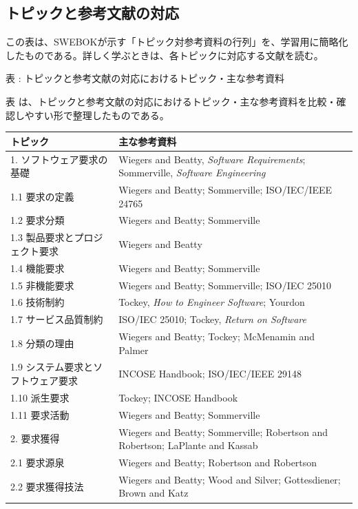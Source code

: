 \subsection{トピックと参考文献の対応}

この表は、SWEBOKが示す「トピック対参考資料の行列」を、学習用に簡略化したものである。詳しく学ぶときは、各トピックに対応する文献を読む。

\small
\par\smallskip\noindent{}\label{tab:ch01-12}表 \thetable: トピックと参考文献の対応におけるトピック・主な参考資料\par\smallskip
表 \thetable は、トピックと参考文献の対応におけるトピック・主な参考資料を比較・確認しやすい形で整理したものである。\par\smallskip
\begin{longtable}{@{}p{.38\linewidth}p{.55\linewidth}@{}}
\toprule
トピック & 主な参考資料 \\
\midrule
\endhead
1. ソフトウェア要求の基礎 & Wiegers and Beatty, \textit{Software Requirements}; Sommerville, \textit{Software Engineering} \\
1.1 要求の定義 & Wiegers and Beatty; Sommerville; ISO/IEC/IEEE 24765 \\
1.2 要求分類 & Wiegers and Beatty; Sommerville \\
1.3 製品要求とプロジェクト要求 & Wiegers and Beatty \\
1.4 機能要求 & Wiegers and Beatty; Sommerville \\
1.5 非機能要求 & Wiegers and Beatty; Sommerville; ISO/IEC 25010 \\
1.6 技術制約 & Tockey, \textit{How to Engineer Software}; Yourdon \\
1.7 サービス品質制約 & ISO/IEC 25010; Tockey, \textit{Return on Software} \\
1.8 分類の理由 & Wiegers and Beatty; Tockey; McMenamin and Palmer \\
1.9 システム要求とソフトウェア要求 & INCOSE Handbook; ISO/IEC/IEEE 29148 \\
1.10 派生要求 & Tockey; INCOSE Handbook \\
1.11 要求活動 & Wiegers and Beatty; Sommerville \\
2. 要求獲得 & Wiegers and Beatty; Sommerville; Robertson and Robertson; LaPlante and Kassab \\
2.1 要求源泉 & Wiegers and Beatty; Robertson and Robertson \\
2.2 要求獲得技法 & Wiegers and Beatty; Wood and Silver; Gottesdiener; Brown and Katz \\

\end{longtable}
